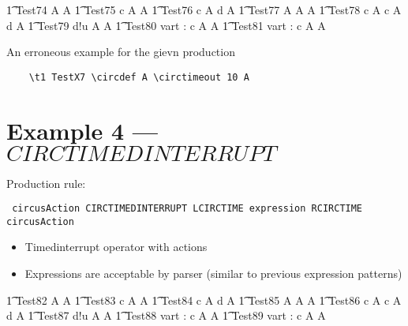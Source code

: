 \documentclass{article}
\begin{document}
\begin{circusaction}
   \t1 Test74 \circdef A  A
   \also
   \t1 Test75 \circdef c \then A  A 
   \also
   \t1 Test76 \circdef c \then A  d \then A 
   \also
   \t1 Test77 \circdef A  A \circseq A
   \also
   \t1 Test78 \circdef c \then A  c \then A \circseq d  
   \then A
   \also
   \t1 Test79 \circdef d!u \then A  A
   \also
   \t1 Test80 \circdef \circvres vart : \nat \circspot c \then A  A
   \also
   \t1 Test81 \circdef \circvres vart : \nat \circspot c \then A  A
\end{circusaction}

An erroneous example for the gievn production 
\begin{verbatim}
	\t1 TestX7 \circdef A \circtimeout 10 A
\end{verbatim}



\section{Example 4 --- $CIRCTIMEDINTERRUPT$}

Production rule:
\begin{verbatim}
 circusAction CIRCTIMEDINTERRUPT LCIRCTIME expression RCIRCTIME circusAction
\end{verbatim}
	
\begin{itemize}
	\item Timedinterrupt operator with actions
	\item Expressions are acceptable by parser (similar to previous expression patterns)
\end{itemize}


\begin{circusaction}
   \t1 Test82 \circdef A  A
   \also
   \t1 Test83 \circdef c \then A  A 
   \also
   \t1 Test84 \circdef c \then A  d \then A 
   \also
   \t1 Test85 \circdef A  A \circseq A
   \also
   \t1 Test86 \circdef c \then A  c \then A  
   \circseq d \then A
   \also
   \t1 Test87 \circdef d!u \then A  A
   \also
   \t1 Test88 \circdef \circvres vart : \nat \circspot c \then A  A
   \also
   \t1 Test89 \circdef \circvres vart : \nat \circspot c \then A  A
\end{circusaction}
	
\end{document}
